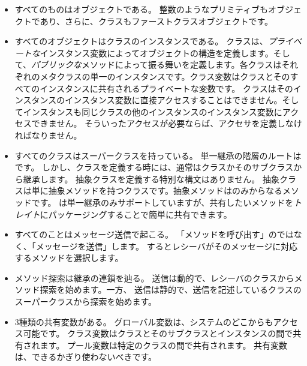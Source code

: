 \documentclass[a4paper,10pt,twoside]{book}
\begin{document}
\begin{itemize}
  \item すべてのものはオブジェクトである。
  整数のようなプリミティブもオブジェクトであり、さらに、クラスもファーストクラスオブジェクトです。

  \item すべてのオブジェクトはクラスのインスタンスである。
  クラスは、\emph{プライベートな}インスタンス変数によってオブジェクトの構造を定義します。そして、\emph{パブリックな}メソッドによって振る舞いを定義します。各クラスはそれぞれのメタクラスの単一のインスタンスです。クラス変数はクラスとそのすべてのインスタンスに共有されるプライベートな変数です。
  クラスはそのインスタンスのインスタンス変数に直接アクセスすることはできません。そしてインスタンスも同じクラスの他のインスタンスのインスタンス変数にアクセスできません。
  そういったアクセスが必要ならば、アクセサを定義しなければなりません。

  \item すべてのクラスはスーパークラスを持っている。
  単一継承の階層のルートはです。
  しかし、クラスを定義する時には、通常はクラスかそのサブクラスから継承します。
  抽象クラスを定義する特別な構文はありません。
  抽象クラスは単に抽象メソッドを持つクラスです。抽象メソッドはのみからなるメソッドです。
  \pharo は単一継承のみサポートしていますが、共有したいメソッドを\emph{トレイト}にパッケージングすることで簡単に共有できます。

  \item すべてのことはメッセージ送信で起こる。
	「メソッドを呼び出す」のではなく、「メッセージを送信」します。
	するとレシーバがそのメッセージに対応するメソッドを選択します。

  \item メソッド探索は継承の連鎖を辿る。
  \self 送信は動的で、レシーバのクラスからメソッド探索を始めます。一方、
  \super 送信は静的で、\super 送信を記述しているクラスのスーパークラスから探索を始めます。
  
  \item 3種類の共有変数がある。
  		グローバル変数は、システムのどこからもアクセス可能です。
		クラス変数はクラスとそのサブクラスとインスタンスの間で共有されます。
		プール変数は特定のクラスの間で共有されます。
		共有変数は、できるかぎり使わないべきです。

\end{itemize}

\ifx\wholebook\relax\else
   
   
\end{document}
